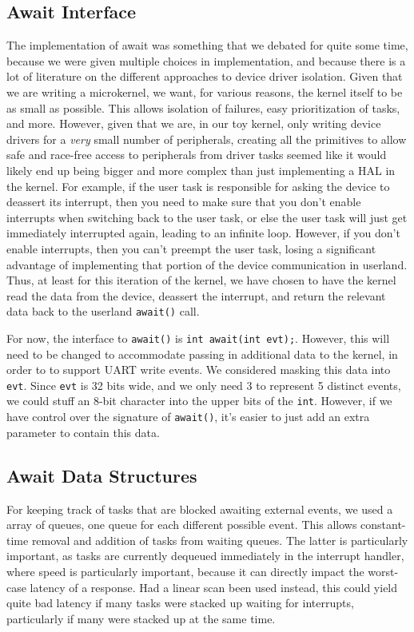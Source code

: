 \documentclass[titlepage]{article}
\begin{document}
\subsection{Await Interface}
The implementation of await was something that we debated for quite some time,
because we were given multiple choices in implementation, and because there is
a lot of literature on the different approaches to device driver isolation.
Given that we are writing a microkernel, we want, for various reasons, the
kernel itself to be as small as possible. This allows isolation of failures,
easy prioritization of tasks, and more. However, given that we are, in our toy
kernel, only writing device drivers for a \emph{very} small number of
peripherals, creating all the primitives to allow safe and race-free access
to peripherals from driver tasks seemed like it would likely end up being
bigger and more complex than just implementing a HAL in the kernel. For
example, if the user task is responsible for asking the device to deassert
its interrupt, then you need to make sure that you don't enable interrupts
when switching back to the user task, or else the user task will just get
immediately interrupted again, leading to an infinite loop. However, if you
don't enable interrupts, then you can't preempt the user task, losing a
significant advantage of implementing that portion of the device communication
in userland. Thus, at least for this iteration of the kernel, we have chosen
to have the kernel read the data from the device, deassert the interrupt,
and return the relevant data back to the userland \texttt{await()} call.

For now, the interface to \texttt{await()} is \texttt{int await(int evt);}.
However, this will need to be changed to accommodate passing in additional data
to the kernel, in order to to support UART write events.
We considered masking this data into \texttt{evt}.
Since \texttt{evt} is 32 bits wide, and we only need 3 to represent 5 distinct events,
we could stuff an 8-bit character into the upper bits of the \texttt{int}.
However, if we have control over the signature of \texttt{await()}, it's easier to just
add an extra parameter to contain this data.

\subsection{Await Data Structures}
For keeping track of tasks that are blocked awaiting external events, we used
a array of queues, one queue for each different possible event. This allows
constant-time removal and addition of tasks from waiting queues. The latter
is particularly important, as tasks are currently dequeued immediately in the
interrupt handler, where speed is particularly important, because it can
directly impact the worst-case latency of a response. Had a linear scan been
used instead, this could  yield quite bad latency if many tasks were stacked
up waiting for interrupts, particularly if many were stacked up at the same
time.
\end{document}
